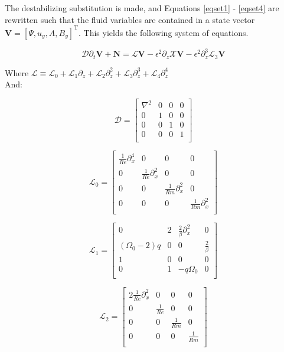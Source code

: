 \documentclass{emulateapj}
\newcommand{\beq}{\begin{equation}}
\newcommand{\eeq}{\end{equation}}
\newcommand\reye{\mathrel{Re}}
\newcommand\reym{\mathrel{Rm}}
\begin{document}
The destabilizing substitution is made, and Equations \ref{eqset1} - \ref{eqset4} are rewritten such that the fluid variables are contained in a state vector $\mathbf{V} = \left[\Psi, u_y, A, B_y\right]^\mathrm{T}$. This yields the following system of equations.

\beq
\mathcal{D}\partial_t \mathbf{V} + \mathbf{N} = \mathcal{L} \mathbf{V} - \epsilon^2\partial_z\mathcal{X} \mathbf{V} - \epsilon^2 \partial_z^3 \mathcal{L}_3\mathbf{V}
\eeq

Where $\mathcal{L} \equiv \mathcal{L}_0 + \mathcal{L}_1\partial_z + \mathcal{L}_2\partial_z^2 + \mathcal{L}_3\partial_z^3 + \mathcal{L}_4\partial_z^4$ \\

And:

\beq
\mathcal{D} = \left[\begin{matrix}
\nabla^2 & 0 & 0 & 0 \\
0 & 1& 0 & 0 \\
0 & 0 & 1 & 0\\
0 & 0 & 0 & 1 \\
\end{matrix}\right]
\eeq

\beq
\mathcal{L}_0 = \left[\begin{matrix}
\frac{1}{\reye}\partial_x^4 & 0 & 0 & 0 \\
0 & \frac{1}{\reye}\partial_x^2 & 0 &0 \\
0 & 0 & \frac{1}{\reym}\partial_x^2 & 0 \\
0 & 0 & 0 & \frac{1}{\reym}\partial_x^2 \\ \end{matrix}\right]
\eeq

\beq
\mathcal{L}_1 = \left[\begin{matrix}
0 & 2 & \frac{2}{\beta}\partial_x^2 & 0 \\
(\Omega_0 - 2)q & 0 & 0 & \frac{2}{\beta} \\
1 & 0 & 0 & 0 \\
0 & 1 & -q\Omega_0 & 0 \\ \end{matrix}\right] 
\eeq

\beq
\mathcal{L}_2 = \left[\begin{matrix}
2\frac{1}{\reye} \partial_x^2 & 0 & 0 & 0 \\
0 & \frac{1}{\reye} & 0 & 0 \\
0 & 0 & \frac{1}{\reym} & 0 \\
0 & 0 & 0 & \frac{1}{\reym} \\ \end{matrix}\right]
\eeq
\end{document}
